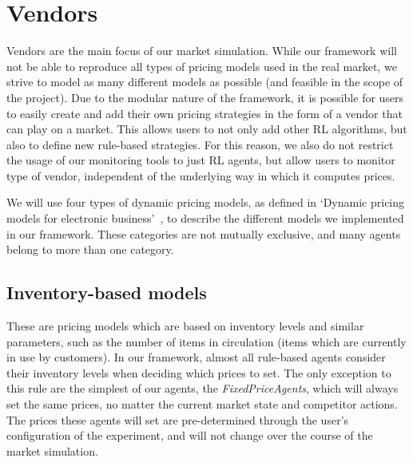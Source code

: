 \section{Vendors}\label{sec:ExplainVendors}

Vendors are the main focus of our market simulation. While our framework will not be able to reproduce all types of pricing models used in the real market, we strive to model as many different models as possible (and feasible in the scope of the project). Due to the modular nature of the framework, it is possible for users to easily create and add their own pricing strategies in the form of a vendor that can play on a market. This allows users to not only add other RL algorithms, but also to define new rule-based strategies. For this reason, we also do not restrict the usage of our monitoring tools to just RL agents, but allow users to monitor type of vendor, independent of the underlying way in which it computes prices.

We will use four types of dynamic pricing models, as defined in `Dynamic pricing models for electronic business'~\cite{dynamicPricingModels}, to describe the different models we implemented in our framework. These categories are not mutually exclusive, and many agents belong to more than one category.

\subsection{Inventory-based models}\label{subsec:InventoryBasedModels}

These are pricing models which are based on inventory levels and similar parameters, such as the number of items in circulation (items which are currently in use by customers). In our framework, almost all rule-based agents consider their inventory levels when deciding which prices to set. The only exception to this rule are the simplest of our agents, the \emph{FixedPriceAgents}, which will always set the same prices, no matter the current market state and competitor actions. The prices these agents will set are pre-determined through the user's configuration of the experiment, and will not change over the course of the market simulation.

